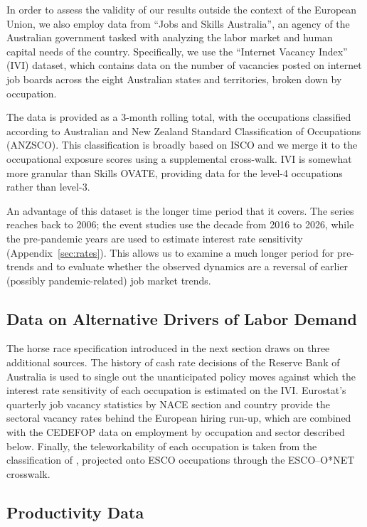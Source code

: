 \documentclass[11pt]{article}
\begin{document}
In order to assess the validity of our results outside the context of the European Union, we also employ data from ``Jobs and Skills Australia'', an agency of the Australian government tasked with analyzing the labor market and human capital needs of the country. Specifically, we use the ``Internet Vacancy Index'' (IVI) dataset, which contains data on the number of vacancies posted on internet job boards across the eight Australian states and territories, broken down by occupation.

The data is provided as a 3-month rolling total, with the occupations classified according to Australian and New Zealand Standard Classification of Occupations (ANZSCO). This classification is broadly based on ISCO and we merge it to the occupational exposure scores using a supplemental cross-walk. IVI is somewhat more granular than Skills OVATE, providing data for the level-4 occupations rather than level-3.  

An advantage of this dataset is the longer time period that it covers. The series reaches back to 2006; the event studies use the decade from 2016 to 2026, while the pre-pandemic years are used to estimate interest rate sensitivity (Appendix~\ref{sec:rates}). This allows us to examine a much longer period for pre-trends and to evaluate whether the observed dynamics are a reversal of earlier (possibly pandemic-related) job market trends.

\subsection{Data on Alternative Drivers of Labor Demand}

The horse race specification introduced in the next section draws on three additional sources. The history of cash rate decisions of the Reserve Bank of Australia \citep{rba_cash_rate} is used to single out the unanticipated policy moves against which the interest rate sensitivity of each occupation is estimated on the IVI. Eurostat's quarterly job vacancy statistics by NACE section and country \citep{eurostat_jvs_q_nace2} provide the sectoral vacancy rates behind the European hiring run-up, which are combined with the CEDEFOP data on employment by occupation and sector described below. Finally, the teleworkability of each occupation is taken from the classification of \citet{dingel2020teleworkable}, projected onto ESCO occupations through the ESCO--O*NET crosswalk.

\subsection{Productivity Data}
\end{document}
